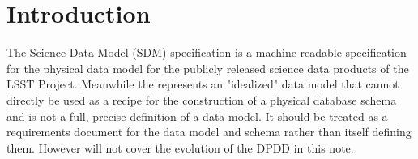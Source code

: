 
\section{Introduction}

The Science Data Model (SDM) specification is a machine-readable specification for the physical data model for the publicly released science data products of the LSST Project.
Meanwhile the \DPDD  represents an "idealized" data model that cannot directly be used as a recipe for the construction of a physical database schema and is not a full, precise definition of a data model.
It should be treated as a requirements document for the data model and schema rather than itself defining them. However will not cover the evolution of the DPDD in this note.


